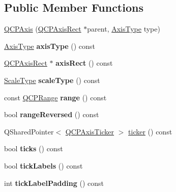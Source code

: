 \subsection*{Public Member Functions}
\begin{DoxyCompactItemize}
\item 
\hyperlink{classQCPAxis_ac62c042968bae0e6d474fcfc57c9b71f}{Q\+C\+P\+Axis} (\hyperlink{classQCPAxisRect}{Q\+C\+P\+Axis\+Rect} $\ast$parent, \hyperlink{classQCPAxis_ae2bcc1728b382f10f064612b368bc18a}{Axis\+Type} type)
\item 
\mbox{\label{classQCPAxis_aa19679359783c5ecd27757b7e5619976}} 
\hyperlink{classQCPAxis_ae2bcc1728b382f10f064612b368bc18a}{Axis\+Type} {\bfseries axis\+Type} () const
\item 
\mbox{\label{classQCPAxis_afc94bcfdf8adfe8e01013f13bdf159a2}} 
\hyperlink{classQCPAxisRect}{Q\+C\+P\+Axis\+Rect} $\ast$ {\bfseries axis\+Rect} () const
\item 
\mbox{\label{classQCPAxis_ad23e9ad97b44e9aeaf4fab8904280098}} 
\hyperlink{classQCPAxis_a36d8e8658dbaa179bf2aeb973db2d6f0}{Scale\+Type} {\bfseries scale\+Type} () const
\item 
\mbox{\label{classQCPAxis_ac4058855a81f1a883cf2e754f6a6acb1}} 
const \hyperlink{classQCPRange}{Q\+C\+P\+Range} {\bfseries range} () const
\item 
\mbox{\label{classQCPAxis_ab9866dd1a78f1920f491ec12a794bec2}} 
bool {\bfseries range\+Reversed} () const
\item 
Q\+Shared\+Pointer$<$ \hyperlink{classQCPAxisTicker}{Q\+C\+P\+Axis\+Ticker} $>$ \hyperlink{classQCPAxis_a7b7a27151be8235059e1294f73ecf615}{ticker} () const
\item 
\mbox{\label{classQCPAxis_a5c3da767a2dc990f200856a9e27ea06e}} 
bool {\bfseries ticks} () const
\item 
\mbox{\label{classQCPAxis_ae4158bbc52939ee52cdb12b805860a28}} 
bool {\bfseries tick\+Labels} () const
\item 
\mbox{\label{classQCPAxis_afac7316ca35941e7080f98e0022c1891}} 
int {\bfseries tick\+Label\+Padding} () const

\end{DoxyCompactItemize}
